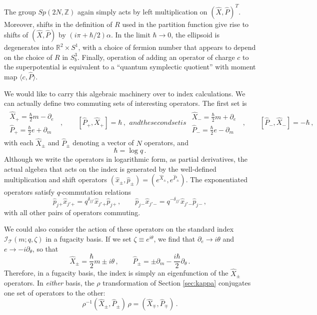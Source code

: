 \documentclass[11pt,letterpaper]{article}
\numberwithin{equation}{section}
\newcommand{\be}{\begin{equation}}
\newcommand{\ee}{\end{equation}}
\newcommand{\Z}{{\mathbb Z}}
\newcommand{\R}{{\mathbb R}}
\newcommand{\pd}{\partial}
\newcommand{\CI}{\mathcal{I}}
\newcommand{\CT}{\mathcal{T}}
\begin{document}
The group $Sp(2N,\Z)$ again simply acts by left multiplication on $(\hat X, \hat P)^T$.
Moreover, shifts in the definition of $R$ used in the partition function give rise to shifts of $(\hat X, \hat P)$ by $(i \pi + \hbar/2) \alpha$.
In the limit $\hbar \to 0$, the ellipsoid is degenerates into
$\R^2 \times S^1$, with a choice of fermion number that appears to depend on the choice of $R$ in $S^3_b$.
Finally, operation of adding an operator of charge $c$ to the superpotential is equivalent to a ``quantum symplectic quotient''
with moment map $\langle c, \hat P \rangle$.

We would like to carry this algebraic machinery over to index calculations.
We can actually define two commuting sets of interesting operators.
The first set is
%
\begin{subequations} \label{XP}
\begin{align}
\left.\begin{array}{l}
\hat X_+ = \tfrac{\hbar}{2} m - \partial_e \\[.1cm]
\hat P_+ = \tfrac{\hbar}{2} e + \partial_m
\end{array}\right.\;\;,
\qquad [\hat P_+,\hat X_+]=\hbar\,,
\end{align}
%
and the second set is
%
\begin{align}
\left.\begin{array}{l}
\hat X_- = \tfrac{\hbar}{2} m + \partial_e \\[.1cm]
\hat P_- = \tfrac{\hbar}{2} e - \partial_m
\end{array}\right.\;\;,
\qquad [\hat P_-,\hat X_-]=-\hbar\,,
\end{align}
\end{subequations}
%
with each $\hat X_\pm$ and $\hat P_\pm$ denoting a vector of $N$ operators, and
%
\be
\boxed{\hbar = \log q\,.}
\label{hlogq}
\ee
%
Although we write the operators in logarithmic form, as partial derivatives, the actual algebra that acts on the index is generated by the well-defined multiplication and shift operators $(\hat x_\pm,\hat p_\pm) = (e^{\hat X_\pm}, e^{\hat P_\pm})$. The exponentiated operators satisfy $q$-commutation relations
%
\be \hat p_j{}_+\hat x_{j'}{}_+ = q^{\delta_{jj'}}\hat x_{j'}{}_+\hat p_j{}_+\,,\qquad \hat p_j{}_-\hat x_{j'}{}_- = q^{-\delta_{jj'}}\hat x_{j'}{}_-\hat p_j{}_-\,, \ee
%
with all other pairs of operators commuting.


We could also consider the action of these operators on the standard index $\CI_\CT(m;q,\zeta)$ in a fugacity basis. If we set $\zeta \equiv e^{i\theta}$, we find that $\pd_e \to i\theta$ and $e\to -i\pd_\theta$, so that
%
\be \hat X_\pm  = \frac\hbar2 m \pm i\theta\,,\qquad \hat P_\pm = \pm\pd_m-\frac{i\hbar}2\pd_\theta\,. \label{XPz} \ee
%
Therefore, in a fugacity basis, the index is simply an eigenfunction of the $\hat X_\pm$ operators. In \emph{either} basis, the $\rho$ transformation of Section \ref{sec:kappa} conjugates one set of operators to the other:
%
\be \rho^{-1}(\hat X_\pm,\hat P_\pm)\,\rho = (\hat X_\mp,\hat P_\mp)\,. \ee
\end{document}
